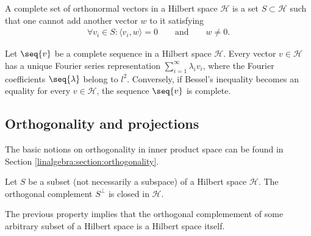    \begin{adefinition}
        A complete set of orthonormal vectors in a Hilbert space $\mathcal{H}$ is a set $S\subset\mathcal{H}$ such that one cannot add another vector $w$ to it satisfying
        \begin{gather}
            \forall v_i\in S:\langle v_i,w \rangle = 0\qquad\text{and}\qquad w\neq0.
        \end{gather}
    \end{adefinition}

    \begin{theorem}[Parceval]
        Let $\seq{v}$ be a complete sequence in a Hilbert space $\mathcal{H}$. Every vector $v\in\mathcal{H}$ has a unique Fourier series representation $\sum_{i=1}^\infty\lambda_iv_i$, where the Fourier coefficients $\seq{\lambda}$ belong to $l^2$. Conversely, if Bessel's inequality becomes an equality for every $v\in\mathcal{H}$, the sequence $\seq{v}$ is complete.
    \end{theorem}

\subsection{Orthogonality and projections}

    The basic notions on orthogonality in inner product space can be found in Section \ref{linalgebra:section:orthogonality}.

    \begin{property}
        Let $S$ be a subset (not necessarily a subspace) of a Hilbert space $\mathcal{H}$. The orthogonal complement $S^\perp$ is closed in $\mathcal{H}$.
    \end{property}
    \begin{result}
        The previous property implies that the orthogonal complemement of some arbitrary subset of a Hilbert space is a Hilbert space itself.
    \end{result}

